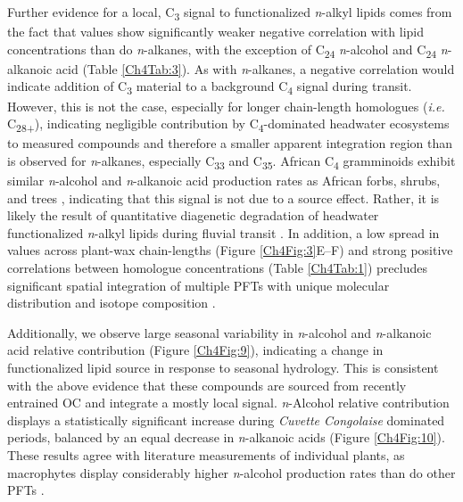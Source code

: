 Further evidence for a local, C\textsubscript{3} signal to functionalized \textit{n}-alkyl lipids comes from the fact that  values show significantly weaker negative correlation with lipid concentrations than do \textit{n}-alkanes, with the exception of C\textsubscript{24} \textit{n}-alcohol and C\textsubscript{24} \textit{n}-alkanoic acid (Table \ref{Ch4Tab:3}). As with \textit{n}-alkanes, a negative correlation would indicate addition of C\textsubscript{3} material to a background C\textsubscript{4} signal during transit. However, this is not the case, especially for longer chain-length homologues (\textit{i.e.} C\textsubscript{28+}), indicating negligible contribution by C\textsubscript{4}-dominated headwater ecosystems to measured compounds and therefore a smaller apparent integration region than is observed for \textit{n}-alkanes, especially C\textsubscript{33} and C\textsubscript{35}. African C\textsubscript{4} gramminoids exhibit similar \textit{n}-alcohol and \textit{n}-alkanoic acid production rates as African forbs, shrubs, and trees \citep{Ali:2005ab,Rommerskirchen:2006gr,Vogts:2009fb}, indicating that this signal is not due to a source effect. Rather, it is likely the result of quantitative diagenetic degradation of headwater functionalized \textit{n}-alkyl lipids during fluvial transit \citep{Cranwell:1981vg,Meyers:1993vwa,Sun:1997wr,Hoefs:2002wu,vanDongen:2008kj}. In addition, a low spread in  values across plant-wax chain-lengths (Figure \ref{Ch4Fig:3}E--F) and strong positive correlations between homologue concentrations (Table \ref{Ch4Tab:1}) precludes significant spatial integration of multiple PFTs with unique molecular distribution and isotope composition \citep[\textit{c.f.}][]{Agrawal:2014fl}.

Additionally, we observe large seasonal variability in \textit{n}-alcohol and \textit{n}-alkanoic acid relative contribution (Figure \ref{Ch4Fig:9}), indicating a change in functionalized lipid source in response to seasonal hydrology. This is consistent with the above evidence that these compounds are sourced from recently entrained OC and integrate a mostly local signal. \textit{n}-Alcohol relative contribution displays a statistically significant increase during \textit{Cuvette Congolaise} dominated periods, balanced by an equal decrease in \textit{n}-alkanoic acids (Figure \ref{Ch4Fig:10}). These results agree with literature measurements of individual plants, as macrophytes display considerably higher \textit{n}-alcohol production rates than do other PFTs \citep{Ficken:1998vs,Ficken:2000wq,Bugalho:2004kj,Ali:2005ab,Ali:2005cr,Aichner:2010bk,Gao:2011dj,Diefendorf:2011hg,Wang:2012fb,Gao:2014bk}.


